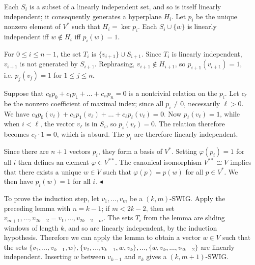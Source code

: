 Each $S_{i}$ is a subset of a linearly independent set, and so is itself linearly independent; it consequently generates a hyperplane $H_{i}$. Let $p_{i}$ be the unique nonzero element of $V^{*}$ such that $H_{i}=\ker p_{i}$. Each $S_{i}\cup\{w\}$ is linearly independent iff $w\notin H_{i}$ iff $p_{i}(w)=1$.\par




For $0\leq i\leq n-1$, the set $T_{i}$ is $\{v_{i+1}\}\cup S_{i+1}$. Since $T_{i}$ is linearly independent, $v_{i+1}$ is not generated by $S_{i+1}$. Rephrasing, $v_{i+1}\notin H_{i+1}$, so $p_{i+1}(v_{i+1})=1$, i.e. $p_{j}(v_{j})=1$ for $1\leq j\leq n$.\par




Suppose that $c_{0}p_{0}+c_{1}p_{1}+\dots+c_{n}p_{n}=0$ is a nontrivial relation on the $p_{i}$. Let $c_{\ell}$ be the nonzero coefficient of maximal index; since all $p_{i}\neq 0$, necessarily $\ell>0$. We have $c_{0}p_{0}(v_{\ell})+c_{1}p_{1}(v_{\ell})+\dots+c_{\ell}p_{\ell}(v_{\ell})=0$. Now $p_{\ell}(v_{\ell})=1$, while when $i<\ell$, the vector $v_{\ell}$ is in $S_{i}$, so $p_{i}(v_{\ell})=0$. The relation therefore becomes $c_{\ell}\cdot 1=0$, which is absurd. The $p_{i}$ are therefore linearly independent.\par




Since there are $n+1$ vectors $p_{i}$, they form a basis of $V^{*}$. Setting $\varphi(p_{i})=1$ for all $i$ then defines an element $\varphi\in V^{**}$. The canonical isomorphism $V^{**}\cong V$ implies that there exists a unique $w\in V$ such that $\varphi(p)=p(w)$ for all $p\in V^{*}$. We then have $p_{i}(w)=1$ for all $i$.
$\blacktriangleleft$\par




To prove the induction step, let $v_{1},\dots,v_{m}$ be a $(k,m)$-SWIG. Apply the preceding lemma with $n=k-1$; if $m<2k-2$, then set $v_{m+1},\dots,v_{2k-2}=v_{1},\dots,v_{2k-2-m}$. The sets $T_{i}$ from the lemma are sliding windows of length $k$, and so are linearly independent, by the induction hypothesis. Therefore we can apply the lemma to obtain a vector $w\in V$ such that the sets $\{v_{1},\dots,v_{k-1},w\},\{v_{2},\dots,v_{k-1},w,v_{k}\},\dots,\{w,v_{k},\dots,v_{2k-2}\}$ are linearly independent. Inserting $w$ between $v_{k-1}$ and $v_{k}$ gives a $(k,m+1)$-SWIG.\par




